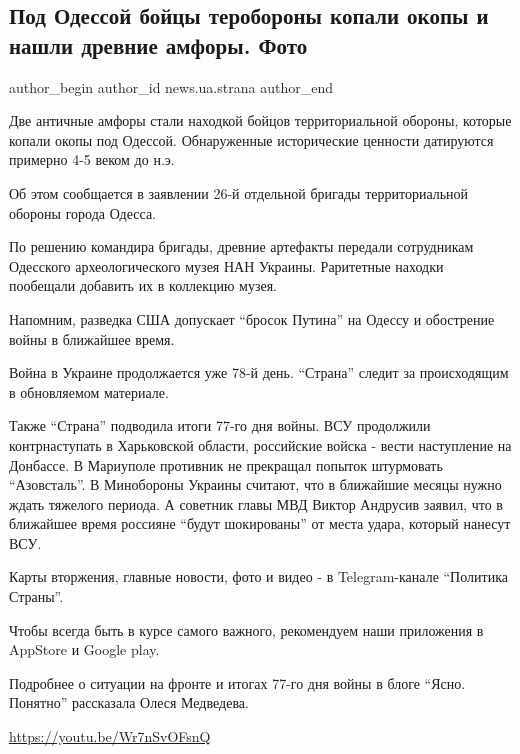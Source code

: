  
 
 
 
 
 
\subsection{Под Одессой бойцы теробороны копали окопы и нашли древние амфоры. Фото}
\label{sec:12_05_2022.stz.news.ua.strana.1.odessa_amfory}
 
\ifcmt
 author_begin
   author_id news.ua.strana
 author_end
\fi

Две античные амфоры стали находкой бойцов территориальной обороны, которые
копали окопы под Одессой. Обнаруженные исторические ценности датируются
примерно 4-5 веком до н.э.


Об этом сообщается в заявлении 26-й отдельной бригады территориальной обороны
города Одесса.

По решению командира бригады, древние артефакты передали сотрудникам Одесского
археологического музея НАН Украины. Раритетные находки пообещали добавить их в
коллекцию музея.

Напомним, разведка США допускает \enquote{бросок Путина} на Одессу и обострение войны в
ближайшее время. 


Война в Украине продолжается уже 78-й день. \enquote{Страна} следит за происходящим в
обновляемом материале. 

Также \enquote{Страна} подводила итоги 77-го дня войны. ВСУ продолжили контрнаступать в
Харьковской области, российские войска - вести наступление на Донбассе. В
Мариуполе противник не прекращал попыток штурмовать \enquote{Азовсталь}. В Минобороны
Украины считают, что в ближайшие месяцы нужно ждать тяжелого периода. А
советник главы МВД Виктор Андрусив заявил, что в ближайшее время россияне
\enquote{будут шокированы} от места удара, который нанесут ВСУ. 


Карты вторжения, главные новости, фото и видео - в Telegram-канале \enquote{Политика
Страны}.

Чтобы всегда быть в курсе самого важного, рекомендуем наши приложения в
AppStore и Google play.

Подробнее о ситуации на фронте и итогах 77-го дня войны в блоге \enquote{Ясно. Понятно}
рассказала Олеся Медведева.

\url{https://youtu.be/Wr7nSvOFsnQ}
